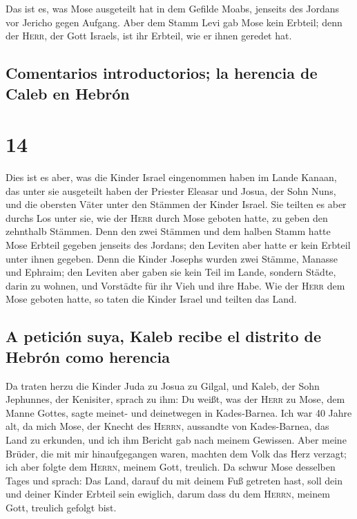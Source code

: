 Das ist es, was Mose ausgeteilt hat in dem Gefilde
Moabs, jenseits des Jordans vor Jericho gegen Aufgang. 
Aber dem Stamm Levi gab Mose kein Erbteil; denn der \textsc{Herr}, der
Gott Israels, ist ihr Erbteil, wie er ihnen geredet hat.

\hypertarget{comentarios-introductorios-la-herencia-de-caleb-en-hebruxf3n}{%
\subsection{Comentarios introductorios; la herencia de Caleb en
Hebrón}\label{comentarios-introductorios-la-herencia-de-caleb-en-hebruxf3n}}

\hypertarget{section-13}{%
\section{14}\label{section-13}}

 Dies ist es aber, was die Kinder Israel eingenommen haben
im Lande Kanaan, das unter sie ausgeteilt haben der Priester Eleasar und
Josua, der Sohn Nuns, und die obersten Väter unter den Stämmen der
Kinder Israel.  Sie teilten es aber durchs Los unter sie,
wie der \textsc{Herr} durch Mose geboten hatte, zu geben den zehnthalb
Stämmen.  Denn den zwei Stämmen und dem halben Stamm hatte
Mose Erbteil gegeben jenseits des Jordans; den Leviten aber hatte er
kein Erbteil unter ihnen gegeben.  Denn die Kinder Josephs
wurden zwei Stämme, Manasse und Ephraim; den Leviten aber gaben sie kein
Teil im Lande, sondern Städte, darin zu wohnen, und Vorstädte für ihr
Vieh und ihre Habe.  Wie der \textsc{Herr} dem Mose
geboten hatte, so taten die Kinder Israel und teilten das Land.

\hypertarget{a-peticiuxf3n-suya-kaleb-recibe-el-distrito-de-hebruxf3n-como-herencia}{%
\subsection{A petición suya, Kaleb recibe el distrito de Hebrón como
herencia}\label{a-peticiuxf3n-suya-kaleb-recibe-el-distrito-de-hebruxf3n-como-herencia}}

 Da traten herzu die Kinder Juda zu Josua zu Gilgal, und
Kaleb, der Sohn Jephunnes, der Kenisiter, sprach zu ihm: Du weißt, was
der \textsc{Herr} zu Mose, dem Manne Gottes, sagte meinet- und
deinetwegen in Kades-Barnea.  Ich war 40 Jahre alt, da
mich Mose, der Knecht des \textsc{Herrn}, aussandte von Kades-Barnea,
das Land zu erkunden, und ich ihm Bericht gab nach meinem Gewissen.
 Aber meine Brüder, die mit mir hinaufgegangen waren,
machten dem Volk das Herz verzagt; ich aber folgte dem \textsc{Herrn},
meinem Gott, treulich.  Da schwur Mose desselben Tages und
sprach: Das Land, darauf du mit deinem Fuß getreten hast, soll dein und
deiner Kinder Erbteil sein ewiglich, darum dass du dem \textsc{Herrn},
meinem Gott, treulich gefolgt bist.

